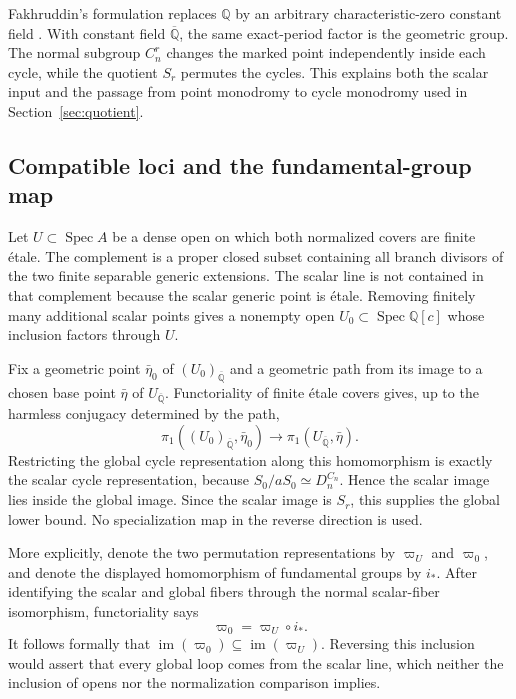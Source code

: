 \documentclass[11pt]{article}
\theoremstyle{definition}
\theoremstyle{remark}
\newcommand{\Q}{\mathbb{Q}}
\newcommand{\Qbar}{\overline{\mathbb{Q}}}
\newcommand{\Spec}{\operatorname{Spec}}
\newcommand{\etale}{\'{e}tale}
\begin{document}
Fakhruddin's formulation replaces $\Q$ by an arbitrary characteristic-zero
constant field \citep{fakhruddin-2014-generic-endomorphisms}.  With constant
field $\Qbar$, the same exact-period factor is the geometric group.  The
normal subgroup $C_n^r$ changes the marked point independently inside each
cycle, while the quotient $S_r$ permutes the cycles.  This explains both the
scalar input and the passage from point monodromy to cycle monodromy used in
Section~\ref{sec:quotient}.

\subsection{Compatible loci and the fundamental-group map}

Let $U\subset\Spec A$ be a dense open on which both normalized covers are
finite \etale.  The complement is a proper closed subset containing all
branch divisors of the two finite separable generic extensions.  The scalar
line is not contained in that complement because the scalar generic point
is \etale.  Removing finitely many additional scalar points gives a nonempty
open $U_0\subset\Spec\Q[c]$ whose inclusion factors through $U$.

Fix a geometric point $\bar\eta_0$ of $(U_0)_{\Qbar}$ and a geometric path
from its image to a chosen base point $\bar\eta$ of $U_{\Qbar}$.  Functoriality
of finite \etale{} covers gives, up to the harmless conjugacy determined by
the path,
\[
 \pi_1((U_0)_{\Qbar},\bar\eta_0)
 \longrightarrow
 \pi_1(U_{\Qbar},\bar\eta).
\]
Restricting the global cycle representation along this homomorphism is
exactly the scalar cycle representation, because
$S_0/aS_0\simeq D_n^{C_n}$.  Hence the scalar image lies inside the global
image.  Since the scalar image is $S_r$, this supplies the global lower
bound.  No specialization map in the reverse direction is used.

More explicitly, denote the two permutation representations by
$\varpi_U$ and $\varpi_0$, and denote the displayed homomorphism of
fundamental groups by $i_*$.  After identifying the scalar and global
fibers through the normal scalar-fiber isomorphism, functoriality says
\[
 \varpi_0=\varpi_U\circ i_*.
\]
It follows formally that
$\operatorname{im}(\varpi_0)\subseteq\operatorname{im}(\varpi_U)$.
Reversing this inclusion would assert that every global loop comes from the
scalar line, which neither the inclusion of opens nor the normalization
comparison implies.
\end{document}
